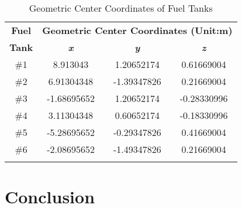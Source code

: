 \documentclass[english]{cccconf}
\begin{document}
\begin{table}[htbp]
  \caption{Geometric Center Coordinates of Fuel Tanks}
  \begin{center}
  \begin{tabular}{c|c|c|c}
  \hhline
  \textbf{Fuel}&\multicolumn{3}{|c|}{\textbf{Geometric Center Coordinates (Unit:m)}} \\
  \cline{2-4} 
  \textbf{Tank} & \textbf{\textit{x}}& \textbf{\textit{y}}& \textbf{\textit{z}} \\
  \hline
  \#1 & 8.913043& 1.20652174 & 0.61669004\\%
  \#2 & 6.91304348 & -1.39347826 & 0.21669004 \\
  \#3 & -1.68695652 & 1.20652174 & -0.28330996 \\
  \#4 & 3.11304348 & 0.60652174 & -0.18330996\\
  \#5 & -5.28695652 & -0.29347826 & 0.41669004\\
  \#6 & -2.08695652 & -1.49347826 & 0.21669004\\
  \hhline
  \end{tabular}
  \label{Table:Geometric Center}
  \end{center}
  \end{table}

\section{Conclusion}










\end{document}
